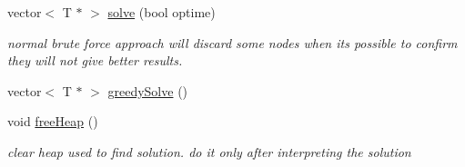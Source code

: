 \begin{DoxyCompactItemize}
\item 
vector$<$ T $\ast$ $>$ \hyperlink{class_brute_force_a9403e140036ec12e8ab3380ce78b5dd6}{solve} (bool optime)
\begin{DoxyCompactList}\small\item\em normal brute force approach will discard some nodes when it\textquotesingle{}s possible to confirm they will not give better results. \end{DoxyCompactList}\item 
vector$<$ T $\ast$ $>$ \hyperlink{class_brute_force_a070b976f2956db17cfff5ff534decd8e}{greedy\+Solve} ()
\item 
\hypertarget{class_brute_force_ac6f8a22139f24e8869d7dcf153522b23}{}void \hyperlink{class_brute_force_ac6f8a22139f24e8869d7dcf153522b23}{free\+Heap} ()\label{class_brute_force_ac6f8a22139f24e8869d7dcf153522b23}

\begin{DoxyCompactList}\small\item\em clear heap used to find solution. do it only after interpreting the solution \end{DoxyCompactList}\end{DoxyCompactItemize}
